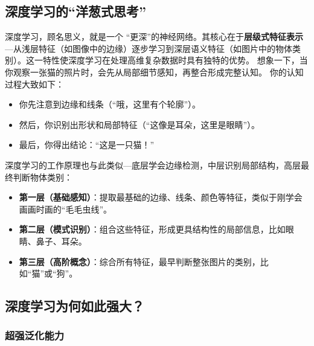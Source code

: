 \subsection{ 深度学习的“洋葱式思考”}


深度学习，顾名思义，就是一个 “更深”的神经网络。其核心在于\textbf{层级式特征表示}---从浅层特征（如图像中的边缘）逐步学习到深层语义特征（如图片中的物体类别）。这一特性使深度学习在处理高维复杂数据时具有独特的优势。
想象一下，当你观察一张猫的照片时，会先从局部细节感知，再整合形成完整认知。
你的认知过程大致如下：
\begin{itemize}
   \item 你先注意到边缘和线条（“哦，这里有个轮廓”）。
  \item 然后，你识别出形状和局部特征（“这像是耳朵，这里是眼睛”）。
  \item  最后，你得出结论：“这是一只猫！”
\end{itemize}
深度学习的工作原理也与此类似---底层学会边缘检测，中层识别局部结构，高层最终判断物体类别：
\begin{itemize}
    \item \textbf{第一层（基础感知）}：提取最基础的边缘、线条、颜色等特征，类似于刚学会画画时画的“毛毛虫线”。
    \item \textbf{第二层（模式识别）}：组合这些特征，形成更具结构性的局部信息，比如眼睛、鼻子、耳朵。
    \item \textbf{第三层（高阶概念）}：综合所有特征，最早判断整张图片的类别，比如“猫”或“狗”。
\end{itemize}
\subsection{深度学习为何如此强大？}


\subsubsection{ 超强泛化能力}

